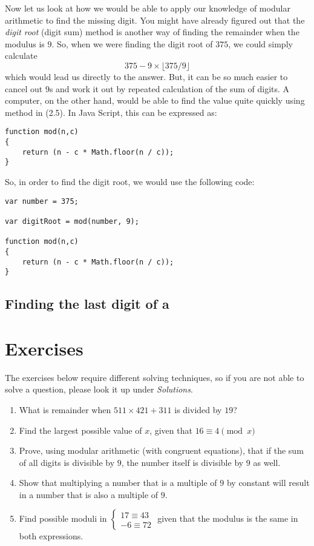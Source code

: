 Now let us look at how we would be able to apply our knowledge of modular arithmetic  to find the missing digit. You might have already figured out that the \textit{digit root} (digit sum) method is another way of finding the remainder when the modulus is $9$. So, when we were finding the digit root of $375$, we could simply calculate
\begin{equation*}
375-9 \times \lfloor 375/9 \rfloor
\end{equation*}
which would lead us directly to the answer. But, it can be so much easier to cancel out $9$s and work it out by repeated calculation of the sum of digits.
A computer, on the other hand, would be able to find the value quite quickly using method in (2.5). In Java Script, this can be expressed as:
\begin{lstlisting}
function mod(n,c)
{
    return (n - c * Math.floor(n / c));
}
\end{lstlisting}
So, in order to find the digit root, we would use the following code:
\begin{lstlisting}
var number = 375;

var digitRoot = mod(number, 9);

function mod(n,c)
{
    return (n - c * Math.floor(n / c));
}
\end{lstlisting}


\subsection{Finding the last digit of a }


\section{Exercises}
The exercises below require different solving techniques, so if you are not able to solve a question, please look it up under \textit{Solutions}.

\begin{enumerate}
\item  What is remainder when $511\times 421 + 311$ is divided by $19$?
\item Find the largest possible value of $x$, given that $16 \equiv 4 \pmod x$
\item Prove, using modular arithmetic (with congruent equations), that if the sum of all digits is divisible by $9$, the number itself is divisible by $9$ as well.
\item Show that multiplying a number that is a multiple of $9$ by constant will result in a number that is also a multiple of $9$.
\item  Find possible moduli in  $
\begin{cases}
17 \equiv 43\\
-6 \equiv 72
\end{cases}$ given that the modulus is the same in both expressions.
\end{enumerate}
